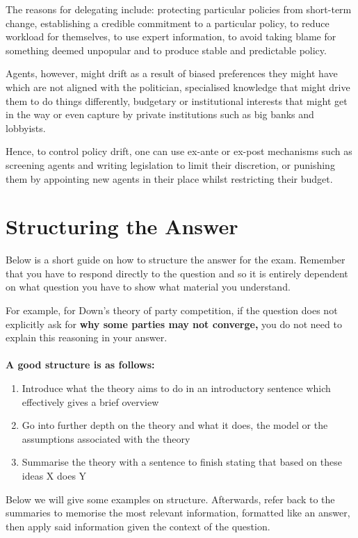 \documentclass[12pt, letterpaper]{article}
\begin{document}
The reasons for delegating include: protecting particular policies from short-term change, establishing a credible commitment to a particular policy, to reduce workload for themselves, to use expert information, to avoid taking blame for something deemed unpopular and to produce stable and predictable policy.

Agents, however, might drift as a result of biased preferences they might have which are not aligned with the politician, specialised knowledge that might drive them to do things differently, budgetary or institutional interests that might get in the way or even capture by private institutions such as big banks and lobbyists.

Hence, to control policy drift, one can use ex-ante or ex-post mechanisms such as screening agents and writing legislation to limit their discretion, or punishing them by appointing new agents in their place whilst restricting their budget.

\newpage
\section{Structuring the Answer}
Below is a short guide on how to structure the answer for the exam. Remember that you have to respond directly to the question and so it is entirely dependent on what question you have to show what material you understand. 

For example, for Down's theory of party competition, if the question does not explicitly ask for \textbf{why some parties may not converge,} you do not need to explain this reasoning in your answer.\\\\
\textbf{A good structure is as follows:}
\begin{enumerate}
	\item Introduce what the theory aims to do in an introductory sentence which effectively gives a brief overview
	\item Go into further depth on the theory and what it does, the model or the assumptions associated with the theory
	\item Summarise the theory with a sentence to finish stating that based on these ideas X does Y
\end{enumerate}
Below we will give some examples on structure. Afterwards, refer back to the summaries to memorise the most relevant information, formatted like an answer, then apply said information given the context of the question.
\end{document}
